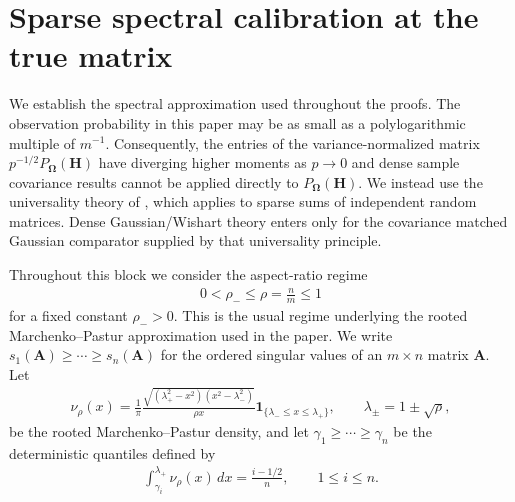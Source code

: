 \documentclass[numsec,webpdf,modern,large,namedate]{oup-authoring-template}
\theoremstyle{plain}
\theoremstyle{remark}
\newcommand{\bH}{\bm{H}}
\newcommand{\bOmega}{\bm{\Omega}}
\newif\ifmarkchanges
\newenvironment{revision}{\begingroup\ifmarkchanges\color{red}\fi}{\endgroup}
\begin{document}
\begin{revision}
\section{Sparse spectral calibration at the true matrix}
\label{sec:supp_sparse_rmt}
We establish the spectral approximation used throughout the proofs. The observation probability in this paper may be as small as a polylogarithmic multiple of $m^{-1}$. Consequently, the entries of the variance-normalized matrix $p^{-1/2}P_{\bOmega}(\bH)$ have diverging higher moments as $p\to0$ and dense sample covariance results cannot be applied directly to $P_{\bOmega}(\bH)$.  We instead use the universality theory of \cite{brailovskaya2024universality}, which applies to sparse sums of
independent random matrices. Dense Gaussian/Wishart theory enters only for the covariance matched Gaussian comparator supplied by that universality principle.

Throughout this block we consider the aspect-ratio regime
\begin{align}
\label{eq:supp_aspect_ratio}
    0<\rho_-\le \rho=\frac{n}{m}\le1
\end{align}
for a fixed constant $\rho_->0$.  This is the usual regime underlying the rooted Marchenko--Pastur approximation used in the paper. We write $s_1(\bm A)\ge\cdots\ge s_n(\bm A)$ for the ordered singular values of an $m\times n$ matrix $\bm A$.  Let
\begin{align}
\label{eq:supp_rooted_mp_density}
    \nu_{\rho}(x)
    = \frac{1}{\pi}\frac{
    \sqrt{(\lambda_+^2-x^2)(x^2-\lambda_-^2)}}{\rho x}
    \mathbf 1_{\{\lambda_-\le x\le\lambda_+\}},
    \qquad
    \lambda_{\pm}=1\pm\sqrt{\rho},
\end{align}
be the rooted Marchenko--Pastur density, and let $\gamma_1\ge\cdots\ge\gamma_n$ be the deterministic quantiles defined by
\begin{align}
\label{eq:supp_mp_quantiles}
    \int_{\gamma_i}^{\lambda_+}\nu_{\rho}(x)\,dx
    =\frac{i-1/2}{n},\qquad 1\le i\le n.
\end{align}


\end{revision}
\end{document}
